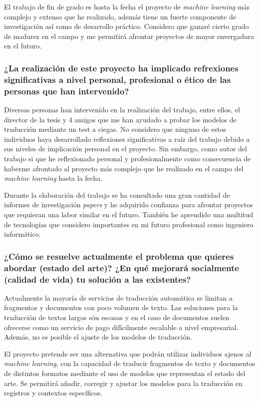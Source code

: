El trabajo de fin de grado es hasta la fecha el proyecto de \textit{machine learning} más
complejo y extenso que he realizado, además tiene un fuerte componente de investigación
así como de desarrollo práctico. Considero que ganaré cierto grado de madurez
en el campo y me permitirá afrontar proyectos de mayor envergadura en el futuro.

\subsubsection{¿La realización de este proyecto ha implicado refrexiones significativas a nivel personal, profesional o ético de las personas que han intervenido?}

Diversas personas han intervenido en la realización del trabajo, entre ellos, el director de la tesis y 4 amigos que me han ayudado a probar los modelos de traducción mediante un test a ciegas. No considero que ninguno de estos individuos haya desarrollado reflexiones significativas a raíz del trabajo debido a sus niveles de implicación personal en el proyecto. Sin embargo, como autor del trabajo si que he reflexionado personal y profesionalmente como consecuencia de haberme afrontado al proyecto más complejo que he realizado en el campo del \textit{machine learning} hasta la fecha.

Durante la elaboración del trabajo se ha consultado una gran cantidad de informes de investigación \textit{papers} y he adquirido confianza para afrontar proyectos que requieran una labor similar en el futuro. También he aprendido una multitud de tecnologías que considero importantes en mi futuro profesional como ingeniero informático.

\subsubsection{¿Cómo se resuelve actualmente el problema que quieres abordar (estado del arte)?
¿En qué mejorará socialmente (calidad de vida) tu solución a las existentes?}

Actualmente la mayoría de servicios de traducción automática se limitan a fragmentos y documentos
con poco volumen de texto. Las soluciones para la traducción de textos largos
són escasas y en el caso de documentos suelen ofrecerse
como un servicio de pago difícilmente escalable a nivel empresarial. Además, no es posible
el ajuste de los modelos de traducción.

El proyecto pretende ser una alternativa que podrán utilizar individuos ajenos al \textit{machine learning},
con la capacidad de traducir fragmentos de texto y documentos de distintos formatos mediante
el uso de modelos que representan el estado del arte.
Se permitirá añadir, corregir y ajustar los modelos para la traducción en registros y contextos
específicos.

